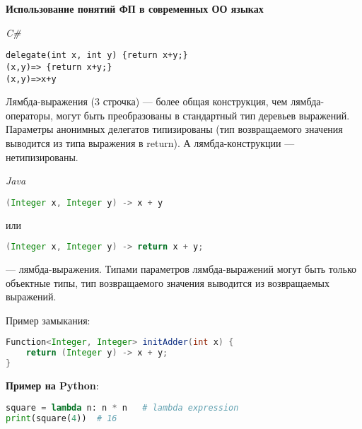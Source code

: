 \textbf{Использование понятий ФП в современных ОО языках}

\textit{C\#}

\begin{lstlisting}
delegate(int x, int y) {return x+y;}
(x,y)=> {return x+y;}
(x,y)=>x+y
\end{lstlisting}

Лямбда-выражения (3 строчка) --- более общая конструкция, чем лямбда-операторы, могут быть преобразованы в стандартный тип деревьев выражений.
Параметры анонимных делегатов типизированы (тип возвращаемого значения выводится из типа выражения в return).
А лямбда-конструкции --- нетипизированы.

\textit{Java}

\begin{lstlisting}[language=Java]
(Integer x, Integer y) -> x + y
\end{lstlisting}
или
\begin{lstlisting}[language=Java]
(Integer x, Integer y) -> return x + y;
\end{lstlisting}
--- лямбда-выражения.
Типами параметров лямбда-выражений могут быть только объектные типы, тип возвращаемого значения выводится из возвращаемых выражений.

Пример замыкания:

\begin{lstlisting}[language=Java]
Function<Integer, Integer> initAdder(int x) {
    return (Integer y) -> x + y;
}
\end{lstlisting}

\textbf{Пример на Python}:

\begin{lstlisting}[language=Python]
square = lambda n: n * n   # lambda expression
print(square(4))  # 16
\end{lstlisting}

